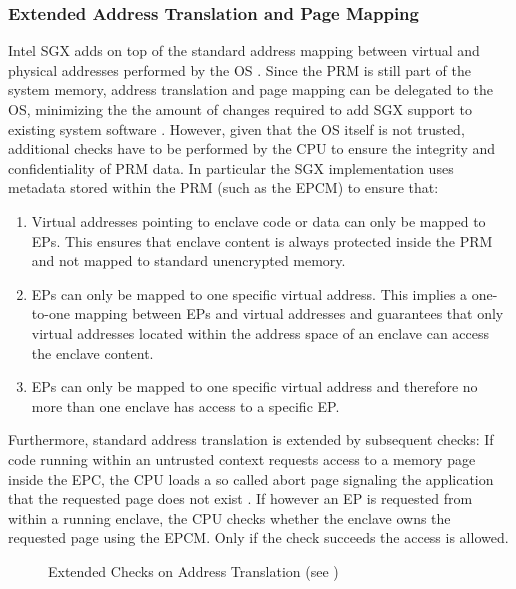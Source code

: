 \subsubsection{Extended Address Translation and Page Mapping}
\label{sec:AddressTranslation}
Intel SGX adds  on top of the standard address mapping between virtual and physical addresses performed by the OS \cite{Costan2016IntelSE}. Since the PRM is still part of the 
system memory, address translation and page mapping can be delegated to the OS, minimizing the the amount of changes required to add SGX support to existing system software 
\cite{IntelSGXSSLab}. However, given that the OS itself is not trusted, additional checks have to be performed by the CPU to ensure the integrity and confidentiality of PRM 
data. In particular the SGX implementation uses metadata stored within the PRM (such as the EPCM) to ensure that:
\begin{enumerate}
    \item Virtual addresses pointing to enclave code or data can only be mapped to EPs. This ensures that enclave content is always protected inside the PRM and not mapped to
          standard unencrypted memory.
    \item EPs can only be mapped to one specific virtual address. This implies a one-to-one mapping between EPs and virtual addresses and guarantees that only virtual addresses
          located within the address space of an enclave can access the enclave content.
    \item EPs can only be mapped to one specific virtual address and therefore no more than one enclave has access to a specific EP.
\end{enumerate}
Furthermore, standard address translation is extended by subsequent checks: If code running within an untrusted context requests access to a memory page inside the EPC,
the CPU loads a so called abort page signaling the application that the requested page does not exist \cite{Costan2016IntelSE}. If however an EP is requested from within a
running enclave, the CPU checks whether the enclave owns the requested page using the EPCM. Only if the check succeeds the access is allowed.

\begin{figure}[h!]
    \centering
    \caption{Extended Checks on Address Translation (see \cite{IntelSGXExplanation})}
    \label{fig:pageCheck}
\end{figure}